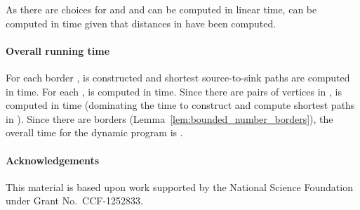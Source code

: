 \documentclass[11pt,twoside]{article}
\begin{document}
As there are  choices for  and  and  can be computed in linear time,  can be computed in  time given that distances in  have been computed.

\paragraph{Overall running time}  For each border ,  is constructed and shortest source-to-sink paths are computed in  time.  For each ,  is computed in  time.  Since there are  pairs of vertices in ,  is computed in  time (dominating the time to construct and compute shortest paths in ).  Since there are  borders (Lemma~\ref{lem:bounded_number_borders}),  the overall time for the dynamic program is .




\paragraph{Acknowledgements}  This material is based upon work supported by the National Science Foundation under Grant No.\ CCF-1252833.




\end{document}
